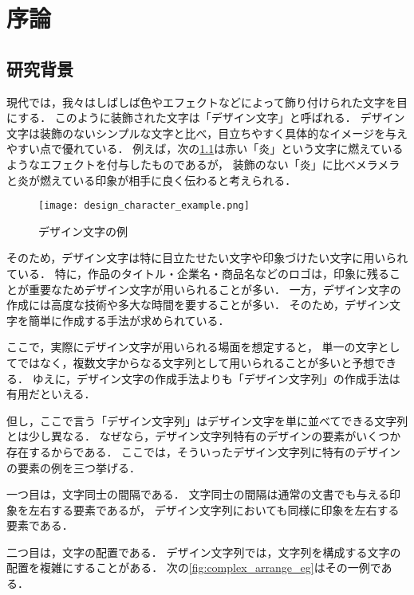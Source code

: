 \documentclass[\homedir/main.tex]{subfiles}
\begin{document}
\setcounter{chapter}{0}
\chapter{序論}\label{chap:introduction}

\section{研究背景}\label{sec:background}
現代では，我々はしばしば色やエフェクトなどによって飾り付けられた文字を目にする．
このように装飾された文字は「デザイン文字」と呼ばれる．
デザイン文字は装飾のないシンプルな文字と比べ，目立ちやすく具体的なイメージを与えやすい点で優れている．
例えば，次の\cref{fig:design_char_eg}は赤い「炎」という文字に燃えているようなエフェクトを付与したものであるが，
装飾のない「炎」に比べメラメラと炎が燃えている印象が相手に良く伝わると考えられる．

\begin{figure}[h]
    \centering
    \texttt{[image: design\_character\_example.png]}
    \caption{デザイン文字の例}
    \label{fig:design_char_eg}
\end{figure}

そのため，デザイン文字は特に目立たせたい文字や印象づけたい文字に用いられている．
特に，作品のタイトル・企業名・商品名などのロゴは，印象に残ることが重要なためデザイン文字が用いられることが多い．
一方，デザイン文字の作成には高度な技術や多大な時間を要することが多い．
そのため，デザイン文字を簡単に作成する手法が求められている．

ここで，実際にデザイン文字が用いられる場面を想定すると，
単一の文字としてではなく，複数文字からなる文字列として用いられることが多いと予想できる．
ゆえに，デザイン文字の作成手法よりも「デザイン文字列」の作成手法は有用だといえる．

但し，ここで言う「デザイン文字列」はデザイン文字を単に並べてできる文字列とは少し異なる．
なぜなら，デザイン文字列特有のデザインの要素がいくつか存在するからである．
ここでは，そういったデザイン文字列に特有のデザインの要素の例を三つ挙げる．

一つ目は，文字同士の間隔である．
文字同士の間隔は通常の文書でも与える印象を左右する要素であるが，
デザイン文字列においても同様に印象を左右する要素である．

二つ目は，文字の配置である．
デザイン文字列では，文字列を構成する文字の配置を複雑にすることがある．
次の\cref{fig:complex_arrange_eg}はその一例である．
\end{document}
